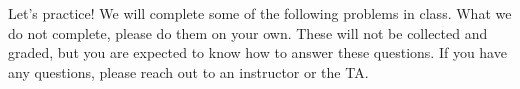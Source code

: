 Let's practice!  We will complete some of the following problems
in class.  What we do not
complete, please do them on your own.  These will not be collected and graded,
but you are expected to know how to answer these questions. If you have any
questions, please reach out to an instructor or the TA.
